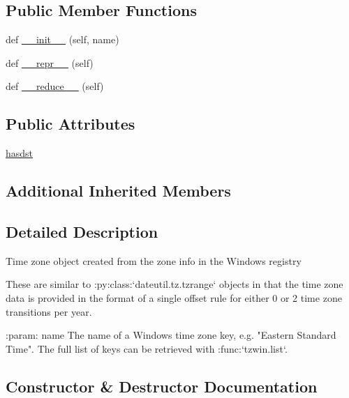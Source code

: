 \subsection*{Public Member Functions}
\begin{DoxyCompactItemize}
\item 
def \hyperlink{classdateutil_1_1tz_1_1win_1_1tzwin_a7deec33950e3b7ea62d02644b7a773e4}{\+\_\+\+\_\+init\+\_\+\+\_\+} (self, name)
\item 
def \hyperlink{classdateutil_1_1tz_1_1win_1_1tzwin_a6fb7127c738df8b72c25746989e25cc1}{\+\_\+\+\_\+repr\+\_\+\+\_\+} (self)
\item 
def \hyperlink{classdateutil_1_1tz_1_1win_1_1tzwin_aafbf6c66e36efbb4fc19ec512102b834}{\+\_\+\+\_\+reduce\+\_\+\+\_\+} (self)
\end{DoxyCompactItemize}
\subsection*{Public Attributes}
\begin{DoxyCompactItemize}
\item 
\hyperlink{classdateutil_1_1tz_1_1win_1_1tzwin_a91b3b00c3616675579de29ecc430e7f5}{hasdst}
\end{DoxyCompactItemize}
\subsection*{Additional Inherited Members}


\subsection{Detailed Description}
\begin{DoxyVerb}Time zone object created from the zone info in the Windows registry

These are similar to :py:class:`dateutil.tz.tzrange` objects in that
the time zone data is provided in the format of a single offset rule
for either 0 or 2 time zone transitions per year.

:param: name
    The name of a Windows time zone key, e.g. "Eastern Standard Time".
    The full list of keys can be retrieved with :func:`tzwin.list`.
\end{DoxyVerb}
 

\subsection{Constructor \& Destructor Documentation}
\mbox{\label{classdateutil_1_1tz_1_1win_1_1tzwin_a7deec33950e3b7ea62d02644b7a773e4}} 
